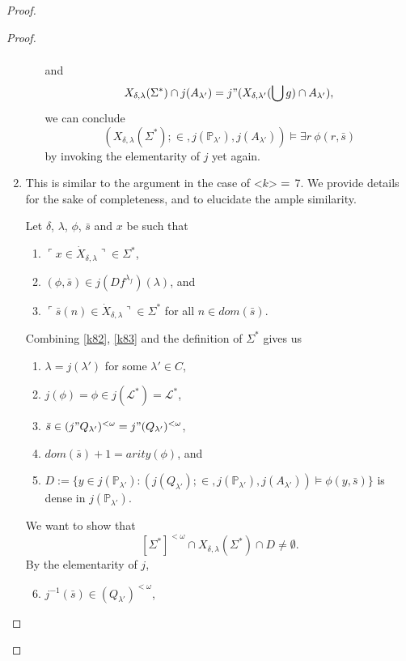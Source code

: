 \documentclass[12pt]{article}
\numberwithin{equation}{section}
\begin{document}
\begin{proof}
\begin{proof}
\begin{enumerate}[label=<$k$> $\eq$ \arabic* :, leftmargin=70pt]
\begin{enumerate}[label=Case \arabic*:, leftmargin=50pt]
\begin{align*}
        \end{align*}
        and
        \begin{align*}
            X_{\delta, \lambda}(\Sigma^*) \cap j(A_{\lambda'}) = j" (X_{\delta, \lambda'}(\bigcup g) \cap A_{\lambda'}),
        \end{align*}
        we can conclude $$(X_{\delta, \lambda}(\Sigma^*); \in, j(\mathbb{P}_{\lambda'}), j(A_{\lambda'})) \models \exists r \ \phi(r, \bar{s})$$ by invoking the elementarity of $j$ yet again.
    \end{enumerate}
    \item This is similar to the argument in the case of <$k$> $\eq$ 7. We provide details for the sake of completeness, and to elucidate the ample similarity. 
    
    Let $\delta$, $\lambda$, $\phi$, $\bar{s}$ and $x$ be such that 
    \begin{enumerate}[label=(K8.\arabic*), leftmargin=50pt]
        \item $\ulcorner x \in \dot{X}_{\delta, \lambda} \urcorner \in \Sigma^*$,
        \item\label{k82} $(\phi, \bar{s}) \in j(Df^{\lambda_f})(\lambda)$, and
        \item\label{k83} $\ulcorner \bar{s}(n) \in \dot{X}_{\delta, \lambda} \urcorner \in \Sigma^*$ for all $n \in dom(\bar{s})$.
    \end{enumerate}
    Combining \ref{k82}, \ref{k83} and the definition of $\Sigma^*$ gives us 
    \begin{enumerate}[label=(\alph*)]
        \item $\lambda = j(\lambda')$ for some $\lambda' \in C$,
        \item $j(\phi) = \phi \in j(\mathcal{L}^*) = \mathcal{L}^*$,
        \item $\bar{s} \in (j" Q_{\lambda'})^{< \omega} = j" (Q_{\lambda'})^{< \omega}$,
        \item $dom(\bar{s}) + 1 = arity(\phi)$, and
        \item $D := \{y \in j(\mathbb{P}_{\lambda'}) : (j(Q_{\lambda'}); \in, j(\mathbb{P}_{\lambda'}), j(A_{\lambda'})) \models \phi(y, \bar{s})\}$ is dense in $j(\mathbb{P}_{\lambda'})$.
    \end{enumerate}
    We want to show that $$[\Sigma^*]^{< \omega} \cap X_{\delta, \lambda}(\Sigma^*) \cap D \neq \emptyset.$$ By the elementarity of $j$, 
    \begin{enumerate}[label=(\alph*)]
        \setcounter{enumii}{5}
        \item $j^{-1}(\bar{s}) \in (Q_{\lambda'})^{< \omega}$, 

\end{enumerate}
\end{enumerate}
\end{proof}
\end{proof}
\end{document}
